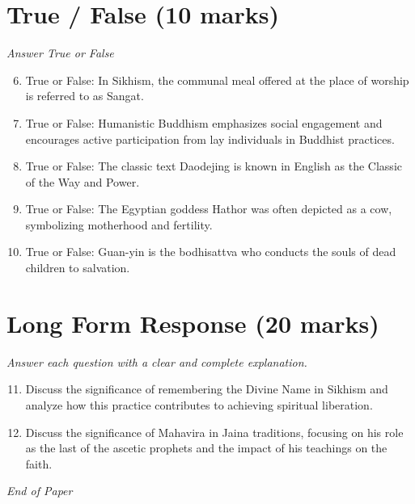 \documentclass[12pt]{article}
\begin{document}
\section*{True / False (10 marks)}
\textit{Answer True or False}
\begin{enumerate}[label=\arabic*.]
\setcounter{enumi}{5}
\item True or False: In Sikhism, the communal meal offered at the place of worship is referred to as Sangat.
\item True or False: Humanistic Buddhism emphasizes social engagement and encourages active participation from lay individuals in Buddhist practices.
\item True or False: The classic text Daodejing is known in English as the Classic of the Way and Power.
\item True or False: The Egyptian goddess Hathor was often depicted as a cow, symbolizing motherhood and fertility.
\item True or False: Guan-yin is the bodhisattva who conducts the souls of dead children to salvation.
\end{enumerate}

\section*{Long Form Response (20 marks)}
\textit{Answer each question with a clear and complete explanation.}
\begin{enumerate}[label=\arabic*.]
\setcounter{enumi}{10}
\item Discuss the significance of remembering the Divine Name in Sikhism and analyze how this practice contributes to achieving spiritual liberation.
\item Discuss the significance of Mahavira in Jaina traditions, focusing on his role as the last of the ascetic prophets and the impact of his teachings on the faith.
\end{enumerate}

\vfill
\noindent\textit{End of Paper}
\end{document}

